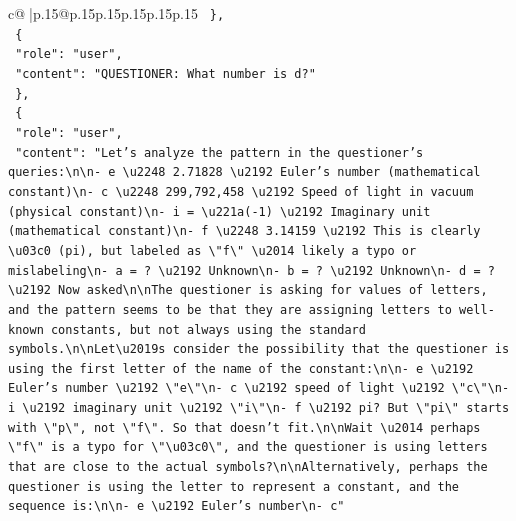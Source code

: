 \documentclass{article}
\begin{document}
{\begin{supertabular}{c@{$\;$}|p{.15\linewidth}@{}p{.15\linewidth}p{.15\linewidth}p{.15\linewidth}p{.15\linewidth}p{.15\linewidth}}
{{{\texttt{  \},} \\
\texttt{  \{} \\
\texttt{    "role": "user",} \\
\texttt{    "content": "QUESTIONER: What number is d?"} \\
\texttt{  \},} \\
\texttt{  \{} \\
\texttt{    "role": "user",} \\
\texttt{    "content": "Let's analyze the pattern in the questioner's queries:\textbackslash{}n\textbackslash{}n{-} e \textbackslash{}u2248 2.71828 \textbackslash{}u2192 Euler's number (mathematical constant)\textbackslash{}n{-} c \textbackslash{}u2248 299,792,458 \textbackslash{}u2192 Speed of light in vacuum (physical constant)\textbackslash{}n{-} i = \textbackslash{}u221a({-}1) \textbackslash{}u2192 Imaginary unit (mathematical constant)\textbackslash{}n{-} f \textbackslash{}u2248 3.14159 \textbackslash{}u2192 This is clearly \textbackslash{}u03c0 (pi), but labeled as \textbackslash{}"f\textbackslash{}" \textbackslash{}u2014 likely a typo or mislabeling\textbackslash{}n{-} a = ? \textbackslash{}u2192 Unknown\textbackslash{}n{-} b = ? \textbackslash{}u2192 Unknown\textbackslash{}n{-} d = ? \textbackslash{}u2192 Now asked\textbackslash{}n\textbackslash{}nThe questioner is asking for values of letters, and the pattern seems to be that they are assigning letters to well{-}known constants, but not always using the standard symbols.\textbackslash{}n\textbackslash{}nLet\textbackslash{}u2019s consider the possibility that the questioner is using the first letter of the name of the constant:\textbackslash{}n\textbackslash{}n{-} e \textbackslash{}u2192 Euler's number \textbackslash{}u2192 \textbackslash{}"e\textbackslash{}"\textbackslash{}n{-} c \textbackslash{}u2192 speed of light \textbackslash{}u2192 \textbackslash{}"c\textbackslash{}"\textbackslash{}n{-} i \textbackslash{}u2192 imaginary unit \textbackslash{}u2192 \textbackslash{}"i\textbackslash{}"\textbackslash{}n{-} f \textbackslash{}u2192 pi? But \textbackslash{}"pi\textbackslash{}" starts with \textbackslash{}"p\textbackslash{}", not \textbackslash{}"f\textbackslash{}". So that doesn't fit.\textbackslash{}n\textbackslash{}nWait \textbackslash{}u2014 perhaps \textbackslash{}"f\textbackslash{}" is a typo for \textbackslash{}"\textbackslash{}u03c0\textbackslash{}", and the questioner is using letters that are close to the actual symbols?\textbackslash{}n\textbackslash{}nAlternatively, perhaps the questioner is using the letter to represent a constant, and the sequence is:\textbackslash{}n\textbackslash{}n{-} e \textbackslash{}u2192 Euler's number\textbackslash{}n{-} c"} \\
}}}
\end{supertabular}}
\end{document}
